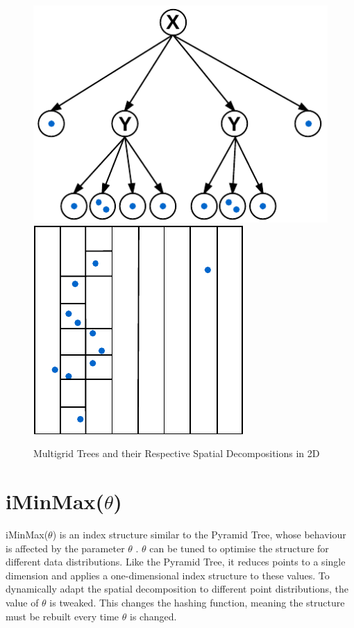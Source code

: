 \begin{figure}
\begin{center}
		\begin{subfloat}{%
			\includegraphics[scale=0.65]{figures/multigrid_levels_tree.pdf}
			\includegraphics[scale=0.65]{figures/multigrid_levels.pdf}
		}
		\end{subfloat}
	\end{center}

	\caption{Multigrid Trees and their Respective Spatial Decompositions in 2D}
	\label{fig:multigrid-trees}
\end{figure}

\section{iMinMax($\theta$)}

iMinMax($\theta$) is an index structure similar to the Pyramid Tree, whose behaviour is affected by the parameter $\theta$ \cite{iminmax}. $\theta$ can be tuned to optimise the structure for different data distributions. Like the Pyramid Tree, it reduces points to a single dimension and applies a one-dimensional index structure to these values. To dynamically adapt the spatial decomposition to different point distributions, the value of $\theta$ is tweaked. This changes the hashing function, meaning the structure must be rebuilt every time $\theta$ is changed.

